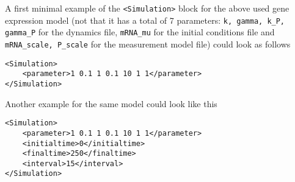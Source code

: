 \documentclass[11pt]{article} %
\begin{document}
A first minimal example of the \texttt{<Simulation>} block for the above used gene expression model (not that it has a total of 7 parameters: \texttt{k, gamma, k\_P, gamma\_P} for the dynamics file, \texttt{mRNA\_mu} for the initial conditions file and \texttt{mRNA\_scale, P\_scale} for the measurement model file) could look as follows
\begin{tcolorbox}
\begin{verbatim}
<Simulation>
    <parameter>1 0.1 1 0.1 10 1 1</parameter>
</Simulation>
\end{verbatim}
\end{tcolorbox}
Another example for the same model could look like this
\begin{tcolorbox}
\begin{verbatim}
<Simulation>
    <parameter>1 0.1 1 0.1 10 1 1</parameter>
    <initialtime>0</initialtime>
    <finaltime>250</finaltime>
    <interval>15</interval>
</Simulation>
\end{verbatim}
\end{tcolorbox}
\end{document}
